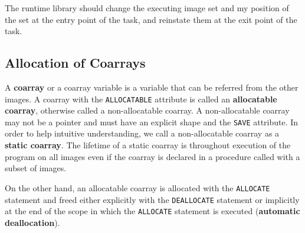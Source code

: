 
\requirement
The runtime library should change the executing image set and my position of the set 
at the entry point of the task, and reinstate them at the exit point of the task.



\subsection{Allocation of Coarrays}

A {\bf coarray} or a coarray variable is a variable that can be referred from the other images. 
A coarray with the {\tt ALLOCATABLE} attribute is called an {\bf allocatable coarray}, 
otherwise called a non-allocatable coarray. A non-allocatable coarray may not be a pointer 
and must have an explicit shape and the {\tt SAVE} attribute. In order to help 
intuitive understanding, we call a non-allocatable coarray as a {\bf static coarray}. 
The lifetime of a static coarray is throughout execution of the program on all images even if
the coarray is declared in a procedure called with a subset of images.

On the other hand, an allocatable coarray is allocated with the {\tt ALLOCATE} statement and 
freed either explicitly with the {\tt DEALLOCATE} statement or implicitly at the end of the 
scope in which the {\tt ALLOCATE} statement is executed ({\bf automatic deallocation}).

